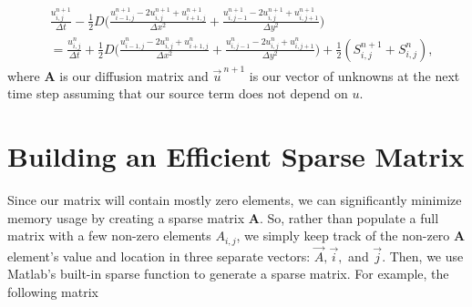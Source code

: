 \documentclass[oneside,12pt,final]{/Applications/TeX/packages/ucthesis-CA2012}
\begin{document}
\begin{mainmatter}
\begin{equation}
\begin{aligned}
&\frac{u_{i,j}^{n+1}}{\Delta t} - \frac{1}{2}D \bigg(\frac{u_{i-1,j}^{n+1}- 2u_{i,j}^{n+1} + u_{i+1,j}^{n+1}}{\Delta x^2} + \frac{u_{i,j-1}^{n+1} - 2u_{i,j}^{n+1} + u_{i,j+1}^{n+1}}{\Delta y^2}\bigg)\\
&= \frac{u_{i,j}^{n}}{\Delta t} + \frac{1}{2}D\bigg(\frac{{u_{i-1,j}^{n}} - 2u_{i,j}^{n} + u_{i+1,j}^{n}}{\Delta x^2} + \frac{u_{i,j-1}^{n} - 2u_{i,j}^{n} + {u_{i,j+1}^{n}}}{\Delta y^2}\bigg)
+ \frac{1}{2}(S_{i,j}^{n+1} + S_{i,j}^{n}),
\end{aligned}
\end{equation}
where $\boldsymbol{A}$ is our diffusion matrix and  $\vec{u}^{\>n+1}$ is our vector of unknowns at the next time step assuming that our source term does not depend on $u$.

\section{Building an Efficient Sparse Matrix}\label{section:Sparse_Matrix}

Since our matrix will contain mostly zero elements, we can significantly minimize memory usage by creating a sparse matrix $\boldsymbol{A}$. So, rather than populate a full matrix with a few non-zero elements $A_{i,j}$, we simply keep track of the non-zero $\boldsymbol{A}$ element's value and location in three separate vectors: $\vec{A}, \vec{i},$ and $\vec{j}$. Then, we use Matlab's built-in sparse function to generate a sparse matrix. For example, the following matrix


\end{mainmatter}
\end{document}
